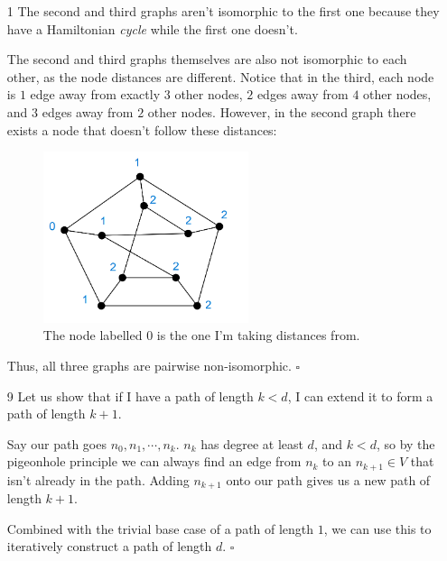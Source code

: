 \documentclass[12pt]{article}
\begin{document}
\begin{enumerate}
      \item[1] The second and third graphs aren't isomorphic to the first one
            because they have a Hamiltonian \textit{cycle} while the first one doesn't.

            The second and third graphs themselves are also not isomorphic to each other,
            as the node distances are different.
            Notice that in the third, each node is $1$ edge away from exactly $3$ other nodes,
            $2$ edges away from $4$ other nodes, and $3$ edges away from $2$ other nodes.
            However, in the second graph there exists a node that doesn't follow
            these distances:
            \begin{figure}[h]
                  \centering
                  \includegraphics[width=6cm]{img/hw1/distance}
                  \caption{The node labelled $0$ is the one I'm taking distances from.}
                  \label{fig:distance}
            \end{figure}
            Thus, all three graphs are pairwise non-isomorphic. $\square$

      \item[9] Let us show that if I have a path of length $k < d$, I can extend it to form a path of length $k+1$.

            Say our path goes $n_0, n_1, \cdots, n_k$.
            $n_k$ has degree at least $d$, and $k<d$, so  by the pigeonhole
            principle we can always find an edge from $n_k$ to an $n_{k+1} \in V$
            that isn't already in the path.
            Adding $n_{k+1}$ onto our path gives us a new path of length $k+1$.

            Combined with the trivial base case of a path of length $1$,
            we can use this to iteratively construct a path of length $d$. $\square$
\end{enumerate}
\end{document}
